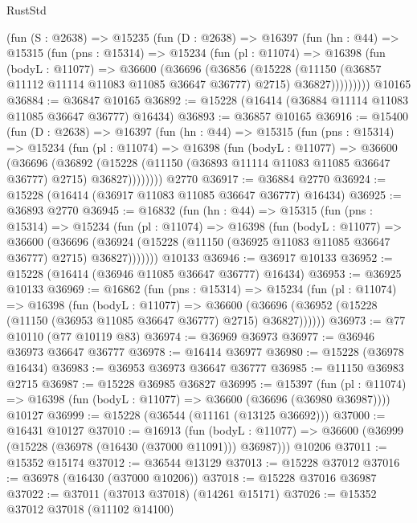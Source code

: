 \begin{lexlean}{RustStd}
\begin{coremodule}
    (fun (S : @2638) =>
    @15235
      (fun (D : @2638) =>
      @16397
        (fun (hn : @44) =>
        @15315
          (fun (pns : @15314) =>
          @15234
            (fun (pl : @11074) =>
            @16398
              (fun (bodyL : @11077) =>
              @36600
                (@36696
                  (@36856
                    (@15228
                      (@11150 (@36857 @11112 @11114 @11083 @11085 @36647 @36777) @2715)
                      @36827)))))))))
    @10165
@36884 := @36847 @10165
@36892 := @15228 (@16414 (@36884 @11114 @11083 @11085 @36647 @36777) @16434)
@36893 := @36857 @10165
@36916 := @15400
    (fun (D : @2638) =>
    @16397
      (fun (hn : @44) =>
      @15315
        (fun (pns : @15314) =>
        @15234
          (fun (pl : @11074) =>
          @16398
            (fun (bodyL : @11077) =>
            @36600
              (@36696
                (@36892
                  (@15228 (@11150 (@36893 @11114 @11083 @11085 @36647 @36777) @2715) @36827))))))))
    @2770
@36917 := @36884 @2770
@36924 := @15228 (@16414 (@36917 @11083 @11085 @36647 @36777) @16434)
@36925 := @36893 @2770
@36945 := @16832
    (fun (hn : @44) =>
    @15315
      (fun (pns : @15314) =>
      @15234
        (fun (pl : @11074) =>
        @16398
          (fun (bodyL : @11077) =>
          @36600
            (@36696
              (@36924 (@15228 (@11150 (@36925 @11083 @11085 @36647 @36777) @2715) @36827)))))))
    @10133
@36946 := @36917 @10133
@36952 := @15228 (@16414 (@36946 @11085 @36647 @36777) @16434)
@36953 := @36925 @10133
@36969 := @16862
    (fun (pns : @15314) =>
    @15234
      (fun (pl : @11074) =>
      @16398
        (fun (bodyL : @11077) =>
        @36600 (@36696 (@36952 (@15228 (@11150 (@36953 @11085 @36647 @36777) @2715) @36827))))))
@36973 := @77 @10110 (@77 @10119 @83)
@36974 := @36969 @36973
@36977 := @36946 @36973 @36647 @36777
@36978 := @16414 @36977
@36980 := @15228 (@36978 @16434)
@36983 := @36953 @36973 @36647 @36777
@36985 := @11150 @36983 @2715
@36987 := @15228 @36985 @36827
@36995 := @15397
    (fun (pl : @11074) => @16398 (fun (bodyL : @11077) => @36600 (@36696 (@36980 @36987))))
    @10127
@36999 := @15228 (@36544 (@11161 (@13125 @36692)))
@37000 := @16431 @10127
@37010 := @16913
    (fun (bodyL : @11077) => @36600 (@36999 (@15228 (@36978 (@16430 (@37000 @11091))) @36987)))
    @10206
@37011 := @15352 @15174
@37012 := @36544 @13129
@37013 := @15228 @37012
@37016 := @36978 (@16430 (@37000 @10206))
@37018 := @15228 @37016 @36987
@37022 := @37011 (@37013 @37018) (@14261 @15171)
@37026 := @15352 @37012 @37018 (@11102 @14100)

\end{coremodule}
\end{lexlean}
